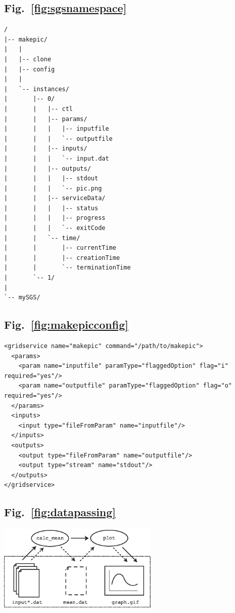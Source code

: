\documentclass[a4paper]{article}
\begin{document}
\newpage

\subsection*{Fig.~\ref{fig:sgsnamespace}}
\begin{verbatim}
/
|-- makepic/
|   |
|   |-- clone
|   |-- config
|   |
|   `-- instances/
|       |-- 0/
|       |   |-- ctl
|       |   |-- params/
|       |   |   |-- inputfile
|       |   |   `-- outputfile
|       |   |-- inputs/
|       |   |   `-- input.dat
|       |   |-- outputs/
|       |   |   |-- stdout
|       |   |   `-- pic.png
|       |   |-- serviceData/
|       |   |   |-- status
|       |   |   |-- progress
|       |   |   `-- exitCode
|       |   `-- time/
|       |       |-- currentTime
|       |       |-- creationTime
|       |       `-- terminationTime
|       `-- 1/
|
`-- mySGS/
\end{verbatim}

\newpage

\subsection*{Fig.~\ref{fig:makepicconfig}}

\begin{verbatim}
<gridservice name="makepic" command="/path/to/makepic">
  <params>
    <param name="inputfile" paramType="flaggedOption" flag="i" required="yes"/>
    <param name="outputfile" paramType="flaggedOption" flag="o" required="yes"/>
  </params>
  <inputs>
    <input type="fileFromParam" name="inputfile"/>
  </inputs>
  <outputs>
    <output type="fileFromParam" name="outputfile"/>
    <output type="stream" name="stdout"/>
  </outputs>
</gridservice>
\end{verbatim}

\newpage

\subsection*{Fig.~\ref{fig:datapassing}}
\includegraphics[height=4.2cm]{datapassing.eps}
\end{document}

